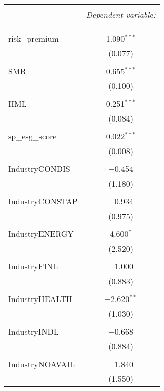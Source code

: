 
\begin{table}[!htbp] \centering 
  \caption{} 
  \label{} 
\begin{tabular}{@{\extracolsep{5pt}}lc} 
\\[-1.8ex]\hline 
\hline \\[-1.8ex] 
 & \multicolumn{1}{c}{\textit{Dependent variable:}} \\ 
\cline{2-2} 
\\[-1.8ex] &   \\ 
\hline \\[-1.8ex] 
 risk\_premium & 1.090$^{***}$ \\ 
  & (0.077) \\ 
  & \\ 
 SMB & 0.655$^{***}$ \\ 
  & (0.100) \\ 
  & \\ 
 HML & 0.251$^{***}$ \\ 
  & (0.084) \\ 
  & \\ 
 sp\_esg\_score & 0.022$^{***}$ \\ 
  & (0.008) \\ 
  & \\ 
 IndustryCONDIS & $-$0.454 \\ 
  & (1.180) \\ 
  & \\ 
 IndustryCONSTAP & $-$0.934 \\ 
  & (0.975) \\ 
  & \\ 
 IndustryENERGY & 4.600$^{*}$ \\ 
  & (2.520) \\ 
  & \\ 
 IndustryFINL & $-$1.000 \\ 
  & (0.883) \\ 
  & \\ 
 IndustryHEALTH & $-$2.620$^{**}$ \\ 
  & (1.030) \\ 
  & \\ 
 IndustryINDL & $-$0.668 \\ 
  & (0.884) \\ 
  & \\ 
 IndustryNOAVAIL & $-$1.840 \\ 
  & (1.550) \\ 

\end{tabular}
\end{table}
